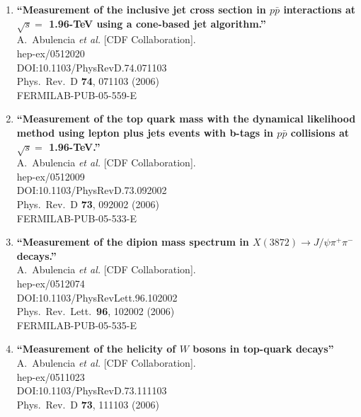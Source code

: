 \documentclass{article}
\begin{document}
\begin{enumerate}
\item%
{\bf ``Measurement of the inclusive jet cross section in $p\bar{p}$ interactions at $\sqrt{s} =$ 1.96-TeV using a cone-based jet algorithm.''}
  \\{}A.~Abulencia {\it et al.} [CDF Collaboration].
  \\{}hep-ex/0512020
  \\{}DOI:10.1103/PhysRevD.74.071103
  \\{}Phys.\ Rev.\ D {\bf 74}, 071103 (2006)
  \\{}FERMILAB-PUB-05-559-E
\item%
{\bf ``Measurement of the top quark mass with the dynamical likelihood method using lepton plus jets events with b-tags in $p\bar{p}$ collisions at $\sqrt{s} =$ 1.96-TeV.''}
  \\{}A.~Abulencia {\it et al.} [CDF Collaboration].
  \\{}hep-ex/0512009
  \\{}DOI:10.1103/PhysRevD.73.092002
  \\{}Phys.\ Rev.\ D {\bf 73}, 092002 (2006)
  \\{}FERMILAB-PUB-05-533-E
\item%
{\bf ``Measurement of the dipion mass spectrum in $X(3872) \to J/\psi \pi^+ \pi^-$ decays.''}
  \\{}A.~Abulencia {\it et al.} [CDF Collaboration].
  \\{}hep-ex/0512074
  \\{}DOI:10.1103/PhysRevLett.96.102002
  \\{}Phys.\ Rev.\ Lett.\  {\bf 96}, 102002 (2006)
  \\{}FERMILAB-PUB-05-535-E
\item%
{\bf ``Measurement of the helicity of $W$ bosons in top-quark decays''}
  \\{}A.~Abulencia {\it et al.} [CDF Collaboration].
  \\{}hep-ex/0511023
  \\{}DOI:10.1103/PhysRevD.73.111103
  \\{}Phys.\ Rev.\ D {\bf 73}, 111103 (2006)

\end{enumerate}
\end{document}
